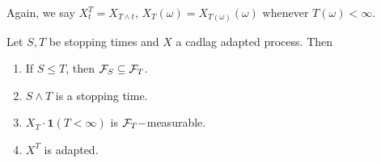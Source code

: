 \documentclass{article}
\begin{document}
Again, we say $ X^{T}_{t} = X_{T\land t}$, $ X_{T}(\omega) = X_{T(\omega)}(\omega)$ whenever $ T(\omega)<\infty$.

\begin{boxprop}\label{prop: stopping times continuous}
	Let $ S,T$ be stopping times and $ X$ a cadlag adapted process. Then
\begin{enumerate}
	\item If $ S\leq T$, then $ \mathcal{F}_{S}\subseteq \mathcal{F}_{T}$.
	\item $ S\land T$ is a stopping time.
	\item $ X_{T}\cdot \mathbf{1}(T<\infty)$ is $ \mathcal{F}_{T}-$measurable.
	\item $ X^{T}$ is adapted.
\end{enumerate}

\end{boxprop}
\end{document}
